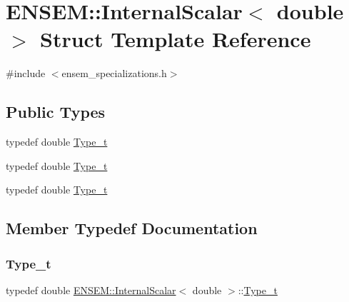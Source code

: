\hypertarget{structENSEM_1_1InternalScalar_3_01double_01_4}{}\section{E\+N\+S\+EM\+:\+:Internal\+Scalar$<$ double $>$ Struct Template Reference}
\label{structENSEM_1_1InternalScalar_3_01double_01_4}


{\ttfamily \#include $<$ensem\+\_\+specializations.\+h$>$}

\subsection*{Public Types}
\begin{DoxyCompactItemize}
\item 
typedef double \mbox{\hyperlink{structENSEM_1_1InternalScalar_3_01double_01_4_a27d32499b6d6d1ba4b217a7276cc8916}{Type\+\_\+t}}
\item 
typedef double \mbox{\hyperlink{structENSEM_1_1InternalScalar_3_01double_01_4_a27d32499b6d6d1ba4b217a7276cc8916}{Type\+\_\+t}}
\item 
typedef double \mbox{\hyperlink{structENSEM_1_1InternalScalar_3_01double_01_4_a27d32499b6d6d1ba4b217a7276cc8916}{Type\+\_\+t}}
\end{DoxyCompactItemize}


\subsection{Member Typedef Documentation}
\mbox{\label{structENSEM_1_1InternalScalar_3_01double_01_4_a27d32499b6d6d1ba4b217a7276cc8916}} 
\subsubsection{\texorpdfstring{Type\_t}{Type\_t}\hspace{0.1cm}{\footnotesize\ttfamily [1/3]}}
{\footnotesize\ttfamily typedef double \mbox{\hyperlink{structENSEM_1_1InternalScalar}{E\+N\+S\+E\+M\+::\+Internal\+Scalar}}$<$ double $>$\+::\mbox{\hyperlink{structENSEM_1_1InternalScalar_3_01double_01_4_a27d32499b6d6d1ba4b217a7276cc8916}{Type\+\_\+t}}}


